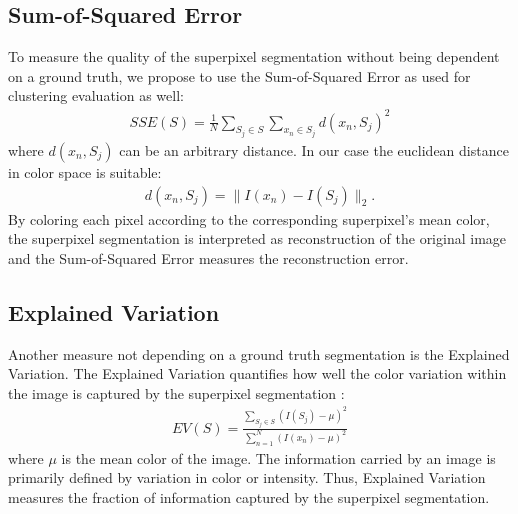 \subsection{Sum-of-Squared Error}

To measure the quality of the superpixel segmentation without being dependent on a ground truth, we propose to use the Sum-of-Squared Error as used for clustering evaluation as well:
\begin{align}
	SSE(S) = \frac{1}{N} \sum_{S_j \in S} \sum_{x_n \in S_j} d(x_n, S_j)^2
\end{align}
where $d(x_n, S_j)$ can be an arbitrary distance. In our case the euclidean distance in color space is suitable:
\begin{align}
	d(x_n, S_j) = \|I(x_n) - I(S_j)\|_2.
\end{align}
By coloring each pixel according to the corresponding superpixel's mean color, the superpixel segmentation is interpreted as reconstruction of the original image and the Sum-of-Squared Error measures the reconstruction error.


\subsection{Explained Variation}

Another measure not depending on a ground truth segmentation is the Explained Variation. The Explained Variation quantifies how well the color variation within the image is captured by the superpixel segmentation \cite{HuazhuFuXiaochunCaoDaiTangYahongHanDongXu:2014}:
\begin{align}
	EV(S) = \frac{\sum_{S_j \in S} (I(S_j) - \mu)^2}{\sum_{n = 1}^N (I(x_n) - \mu)^2}
\end{align}
where $\mu$ is the mean color of the image. The information carried by an image is primarily defined by variation in color or intensity. Thus, Explained Variation measures the fraction of information captured by the superpixel segmentation.

